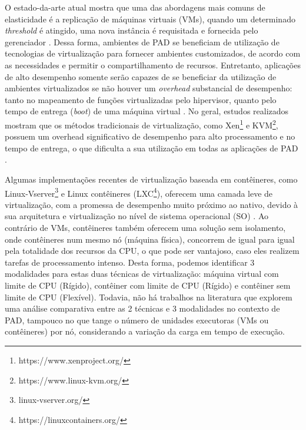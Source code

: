 \documentclass[twoside,english,brazilian]{UNISINOSartigo}
\begin{document}
O estado-da-arte atual mostra que uma das abordagens mais comuns de elasticidade é a replicação de máquinas virtuais (VMs), quando um determinado \textit{threshold} é atingido, uma nova instância é requisitada e fornecida pelo gerenciador \cite{7090978,7185168,6217477}. Dessa forma, ambientes de PAD se beneficiam de utilização de tecnologias de virtualização para fornecer ambientes customizados, de acordo com as necessidades e permitir o compartilhamento de recursos. Entretanto, aplicações de alto desempenho somente serão capazes de se beneficiar da utilização de ambientes virtualizados se não houver um \textit{overhead} substancial de desempenho: tanto no mapeamento de funções virtualizadas pelo hipervisor, quanto pelo tempo de entrega (\textit{boot}) de uma máquina virtual \cite{Xavier2013}. No geral, estudos realizados mostram que os métodos tradicionais de virtualização, como Xen\footnote{https://www.xenproject.org/} e KVM\footnote{https://www.linux-kvm.org/
}, possuem um overhead significativo de desempenho para alto processamento e no tempo de entrega, o que dificulta a sua utilização em todas as aplicações de PAD \cite{Zheng2017}. 

Algumas implementações recentes de virtualização baseada em contêineres, como Linux-Vserver\footnote{linux-vserver.org/} e Linux contêineres (LXC\footnote{https://linuxcontainers.org/}), oferecem uma camada leve de virtualização, com a promessa de desempenho muito próximo ao nativo, devido à sua arquitetura e virtualização no nível de sistema operacional (SO) \cite{Bernstein2014}. Ao contrário de VMs, contêineres também oferecem uma solução sem isolamento, onde contêineres num mesmo nó (máquina física), concorrem de igual para igual pela totalidade dos recursos da CPU, o que pode ser vantajoso, caso eles realizem tarefas de processamento intenso. Desta forma, podemos identificar 3 modalidades para estas duas técnicas de virtualização: máquina virtual com limite de CPU (Rígido), contêiner com limite de CPU (Rígido) e contêiner sem limite de CPU (Flexível). Todavia, não há trabalhos na literatura que explorem uma análise comparativa entre as 2 técnicas e 3 modalidades no contexto de PAD, tampouco no que tange o número de unidades executoras (VMs ou contêineres) por nó, considerando a variação da carga em tempo de execução.
\end{document}
